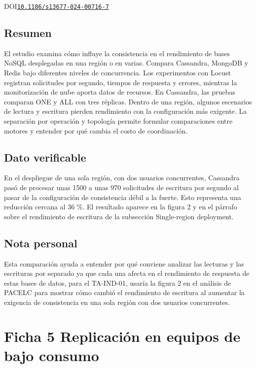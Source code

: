 \documentclass[11pt,a4paper,onecolumn]{article}
\begin{document}
\noindent\cite{ferreira_impacts_2024}\enspace{}

\noindent DOI\enspace\href{https://doi.org/10.1186/s13677-024-00716-7}{\nolinkurl{10.1186/s13677-024-00716-7}}

\subsection*{Resumen}

El estudio examina cómo influye la consistencia en el rendimiento de bases NoSQL desplegadas en una región o en varias. Compara Cassandra, MongoDB y Redis bajo diferentes niveles de concurrencia. Los experimentos con Locust registran solicitudes por segundo, tiempos de respuesta y errores, mientras la monitorización de nube aporta datos de recursos. En Cassandra, las pruebas comparan ONE y ALL con tres réplicas. Dentro de una región, algunos escenarios de lectura y escritura pierden rendimiento con la configuración más exigente. La separación por operación y topología permite formular comparaciones entre motores y entender por qué cambia el costo de coordinación.

\subsection*{Dato verificable}

En el despliegue de una sola región, con dos usuarios concurrentes, Cassandra pasó de procesar unas 1500 a unas 970 solicitudes de escritura por segundo al pasar de la configuración de consistencia débil a la fuerte. Esto representa una reducción cercana al 36 \%. El resultado aparece en la figura 2 y en el párrafo sobre el rendimiento de escritura de la subsección Single-region deployment.

\subsection*{Nota personal}

Esta comparación ayuda a entender por qué conviene analizar las lecturas y las escrituras por separado ya que cada una afecta en el rendimiento de respuesta de estas bases de datos, para el TA-IND-01, usaría la figura 2 en el análisis de PACELC para mostrar cómo cambió el rendimiento de escritura al aumentar la exigencia de consistencia en una sola región con dos usuarios concurrentes.

\clearpage

\section*{Ficha 5 Replicación en equipos de bajo consumo}
\end{document}
